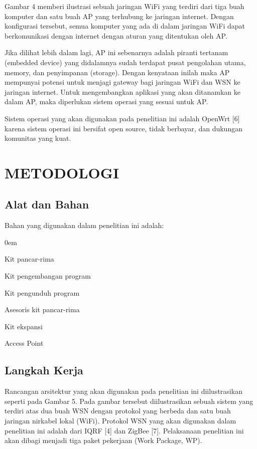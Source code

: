 \documentclass{jtetiproposalskripsi}
\begin{document}
Gambar 4 memberi ilustrasi sebuah jaringan WiFi yang terdiri dari tiga buah komputer dan satu buah AP yang terhubung ke jaringan internet. Dengan konfigurasi tersebut, semua komputer yang ada di dalam jaringan WiFi dapat berkomunikasi dengan internet dengan aturan yang ditentukan oleh AP.

Jika dilihat lebih dalam lagi, AP ini sebenarnya adalah piranti tertanam (embedded device) yang didalamnya sudah terdapat pusat pengolahan utama, memory, dan penyimpanan (storage). Dengan kenyataan inilah maka AP mempunyai potensi untuk menjagi gateway bagi jaringan WiFi dan WSN ke jaringan internet. Untuk mengembangkan aplikasi yang akan ditanamkan ke dalam AP, maka diperlukan sistem operasi yang sesuai untuk AP.

Sistem operasi yang akan digunakan pada penelitian ini adalah OpenWrt [6] karena sistem operasi ini bersifat open source, tidak berbayar, dan dukungan komunitas yang kuat.

\chapter{METODOLOGI}

\section{Alat dan Bahan}
Bahan yang digunakan dalam penelitian ini adalah:

\begin{enumerate}[a.]
\begin{singlespace}
\itemsep0em
\item Kit pancar-rima \tab{}
\item Kit pengembangan program
\item Kit pengunduh program
\item Asesoris kit pancar-rima
\item Kit ekspansi
\item Access Point
\end{singlespace}
\end{enumerate}


\section{Langkah Kerja}
Rancangan arsitektur yang akan digunakan pada penelitian ini diilustrasikan seperti pada Gambar 5. Pada gambar tersebut diilustrasikan sebuah sistem yang terdiri atas dua buah WSN dengan protokol yang berbeda dan satu buah jaringan nirkabel lokal (WiFi). Protokol WSN yang akan digunakan dalam penelitian ini adalah dari IQRF [4] dan ZigBee [7]. Pelaksanaan penelitian ini akan dibagi menjadi tiga paket pekerjaan (Work Package, WP).
\end{document}
